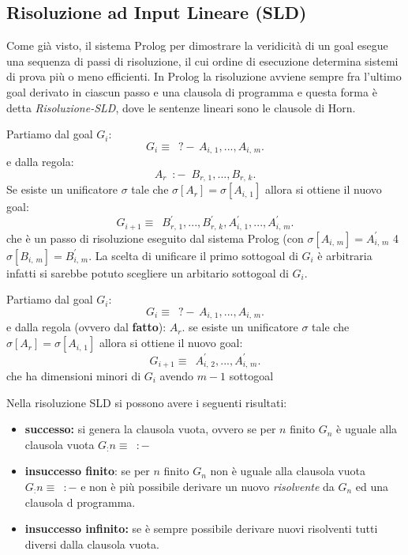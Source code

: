 \subsection{Risoluzione ad Input Lineare (SLD)}
Come già visto, il sistema Prolog per dimostrare la veridicità di un goal esegue una sequenza di passi di risoluzione,
il cui ordine di esecuzione determina sistemi di prova più o meno efficienti.\newline
In Prolog la risoluzione avviene sempre fra l’ultimo goal derivato in ciascun passo e una clausola di programma
e questa forma è detta \emph{Risoluzione-SLD}, dove le sentenze lineari sono le clausole di Horn.
\begin{defi}
Partiamo dal goal $G_i$:
\begin{equation*}
  G_i\equiv \,\,\,?-\, A_{i,\, 1}, ...,  A_{i,\, m}.
\end{equation*}
e dalla regola:
\begin{equation*}
  A_r\,\,\,:-\,\,\, B_{r,\,1},..., B_{r,\,k}.
\end{equation*}
Se esiste un unificatore $\sigma$ tale che $\sigma[A_r]=\sigma[A_{i,\,1}]$ allora si ottiene il nuovo goal:
\begin{equation*}
  G_{i+1}\equiv\,\,\,B^{'}_{r,\,1},..., B^{'}_{r,\,k},A^{'}_{i,\, 1}, ...,  A^{'}_{i,\, m}.
\end{equation*}
che è un passo di risoluzione eseguito dal sistema Prolog (con $\sigma[A_{i,\,m}]=A^{'}_{i,\,m}$ 4 $\sigma[B_{i,\,m}]=B^{'}_{i,\,m}$.\newline
La scelta di unificare il primo sottogoal di $G_i$ è arbitraria infatti si sarebbe potuto scegliere un arbitario sottogoal di $G_i$.

Partiamo dal goal $G_i$:
\begin{equation*}
  G_i\equiv \,\,\,?-\, A_{i,\, 1}, ...,  A_{i,\, m}.
\end{equation*}
e dalla regola (ovvero dal \textbf{fatto}): $A_r$.
se esiste un unificatore $\sigma$ tale che $\sigma[A_r]=\sigma[A_{i,\,1}]$ allora si ottiene il nuovo goal:
\begin{equation*}
  G_{i+1}\equiv\,\,\,A^{'}_{i,\, 2}, ...,  A^{'}_{i,\, m}.
\end{equation*}
che ha dimensioni minori di $G_i$ avendo $m-1$ sottogoal
\end{defi}
Nella risoluzione SLD si possono avere i seguenti risultati:
\begin{itemize}
\item \textbf{successo:} si genera la clausola vuota, ovvero se per $n$ finito $G_n$ è uguale alla clausola vuota $G_:n\equiv\,\,\,:-$
\item \textbf{insuccesso finito}: se per $n$ finito $G_n$  non è uguale alla clausola vuota $G_:n\equiv\,\,\,:-$
              e non è più possibile derivare un nuovo \textit{risolvente} da $G_n$ ed una clausola d programma.
\item \textbf{insuccesso infinito: }se è sempre possibile derivare nuovi risolventi tutti diversi dalla clausola vuota.
\end{itemize}
